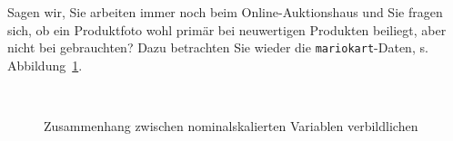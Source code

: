 \documentclass[
  letterpaper,
]{scrbook}
\theoremstyle{definition}
\theoremstyle{definition}
\theoremstyle{definition}
\theoremstyle{remark}
\begin{document}
Sagen wir, Sie arbeiten immer noch beim Online-Auktionshaus und Sie
fragen sich, ob ein Produktfoto wohl primär bei neuwertigen Produkten
beiliegt, aber nicht bei gebrauchten? Dazu betrachten Sie wieder die
\texttt{mariokart}-Daten, s. Abbildung~\ref{fig-zshg-nom1}.

\begin{figure}

\begin{minipage}{0.45\linewidth}



\end{minipage}%
%
\begin{minipage}{0.10\linewidth}
~\end{minipage}%
%
\begin{minipage}{0.45\linewidth}



\end{minipage}%

\caption{\label{fig-zshg-nom1}Zusammenhang zwischen nominalskalierten
Variablen verbildlichen}

\end{figure}%
\end{document}
